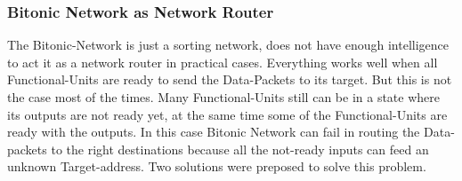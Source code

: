 			\subsubsection{Bitonic Network as Network Router}
				  The Bitonic-Network is just a sorting network, does not have enough intelligence to act it as a network router in practical cases. Everything works well when all Functional-Units 
				  are ready to send the Data-Packets to its target. But this is not the case most of the times. Many Functional-Units still can be in a state where its outputs are not ready yet,
				  at the same time some of the Functional-Units are ready with the outputs. In this case Bitonic Network can fail in routing the Data-packets to the right destinations because all
				  the not-ready inputs can feed an unknown Target-address. Two solutions were preposed to solve this problem.
